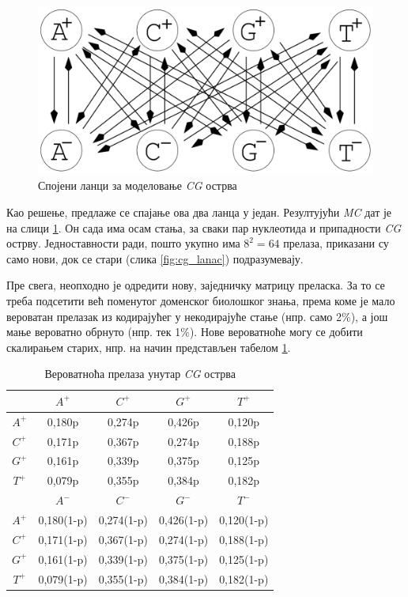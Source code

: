 \documentclass[12pt,oneside]{memoir}
\begin{document}
\begin{CJK}{UTF8}{ipxm}
\begin{figure}[H]
  \centering
  \includegraphics[width=.75\textwidth]{cg_lanci.png}
  \caption{Спојени ланци за моделовање \textit{CG} острва \cite{huson2020}}
  \label{fig:cg_lanci}
\end{figure}

Као решење, предлаже се спајање ова два ланца у један. Резултујући \textit{MC} дат је на слици \ref{fig:cg_lanci}. Он сада има осам стања, за сваки пар нуклеотида и припадности \textit{CG} острву. Једноставности ради, пошто укупно има $8^2 = 64$ прелаза, приказани су само нови, док се стари (слика \ref{fig:cg_lanac}) подразумевају.

Пре свега, неопходно је одредити нову, заједничку матрицу преласка. За то се треба подсетити већ поменутог доменског биолошког знања, према коме је мало вероватан прелазак из кодирајућег у некодирајуће стање (нпр. само 2\%), а још мање вероватно обрнуто (нпр. тек 1\%). Нове вероватноће могу се добити скалирањем старих, нпр. на начин представљен табелом \ref{tab:cg_hmm1}.

\begin{table}[h!]
  \centering
  \caption{Вероватноћа прелаза унутар \textit{CG} острва}
  \begin{tabular}{| c | c c c c |} \hline
   & $A^+$ & $C^+$ & $G^+$ & $T^+$ \\ \hline
  $A^+$ & 0,180p & 0,274p & 0,426p & 0,120p \\
  $C^+$ & 0,171p & 0,367p & 0,274p & 0,188p \\
  $G^+$ & 0,161p & 0,339p & 0,375p & 0,125p \\
  $T^+$ & 0,079p & 0,355p & 0,384p & 0,182p \\ \hhline{= | = = = =}
   & $A^-$ & $C^-$ & $G^-$ & $T^-$ \\ \hline
  $A^+$ & 0,180(1-p) & 0,274(1-p) & 0,426(1-p) & 0,120(1-p) \\
  $C^+$ & 0,171(1-p) & 0,367(1-p) & 0,274(1-p) & 0,188(1-p) \\
  $G^+$ & 0,161(1-p) & 0,339(1-p) & 0,375(1-p) & 0,125(1-p) \\
  $T^+$ & 0,079(1-p) & 0,355(1-p) & 0,384(1-p) & 0,182(1-p) \\ \hline
  \end{tabular}
  \label{tab:cg_hmm1}
\end{table}


\end{CJK}
\end{document}

